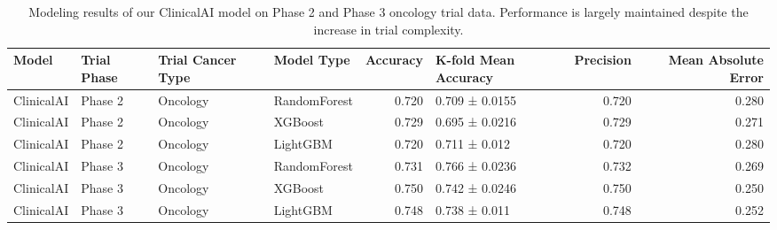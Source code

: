 \begin{table}
\caption{Modeling results of our ClinicalAI model on Phase 2 and Phase 3 oncology trial data. Performance is largely maintained despite the increase in trial complexity.}
\label{tab:model_performance}
\begin{tabular}{llllrlrr}
\toprule
Model & Trial Phase & Trial Cancer Type & Model Type & Accuracy & K-fold Mean Accuracy & Precision & Mean Absolute Error \\
\midrule
ClinicalAI & Phase 2 & Oncology & RandomForest & 0.720 & 0.709 ± 0.0155 & 0.720 & 0.280 \\
ClinicalAI & Phase 2 & Oncology & XGBoost & 0.729 & 0.695 ± 0.0216 & 0.729 & 0.271 \\
ClinicalAI & Phase 2 & Oncology & LightGBM & 0.720 & 0.711 ± 0.012 & 0.720 & 0.280 \\
ClinicalAI & Phase 3 & Oncology & RandomForest & 0.731 & 0.766 ± 0.0236 & 0.732 & 0.269 \\
ClinicalAI & Phase 3 & Oncology & XGBoost & 0.750 & 0.742 ± 0.0246 & 0.750 & 0.250 \\
ClinicalAI & Phase 3 & Oncology & LightGBM & 0.748 & 0.738 ± 0.011 & 0.748 & 0.252 \\
\bottomrule
\end{tabular}
\end{table}
